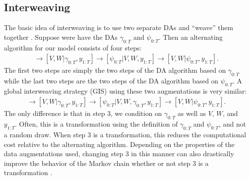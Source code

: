 \documentclass[graybox]{svmult}
\begin{document}
\subsection{Interweaving}\label{sec:inter}
The basic idea of interweaving is to use two separate DAs and ``weave'' them together \citep{yu2011center}. Suppose were have the DAs $\gamma_{0:T}$ and $\psi_{0:T}$. Then an alternating algorithm for our model consists of four steps:
\begin{align*}
[\gamma_{0:T}|V,W,y_{1:T}] \to [V,W|\gamma_{0:T},y_{1:T}] \to [\psi_{0:T}|V,W,y_{1:T}] \to [V,W|\psi_{0:T},y_{1:T}].
\end{align*}
The first two steps are simply the two steps of the DA algorithm based on $\gamma_{0:T}$ while the last two steps are the two steps of the DA algorithm based on $\psi_{0:T}$. A global interweaving strategy (GIS) using these two augmentations is very similar:
\begin{align*}
[\gamma_{0:T}|V,W,y_{1:T}] \to [V,W|\gamma_{0:T},y_{1:T}] \to [\psi_{0:T}|V,W,\gamma_{0:T},y_{1:T}] \to [V,W|\psi_{0:T},y_{1:T}].
\end{align*}
The only difference is that in step 3, we condition on $\gamma_{0:T}$ as well as $V$, $W$, and $y_{1:T}$. Often, this is a transformation using the definition of $\gamma_{0:T}$ and $\psi_{0:T}$, and not a random draw. When step 3 is a transformation, this reduces the computational cost relative to the alternating algorithm. Depending on the properties of the data augmentations used, changing step 3 in this manner can also drastically improve the behavior of the Markov chain whether or not step 3 is a transformation \citep{yu2011center}.
\end{document}
